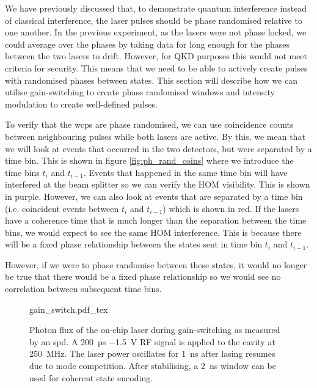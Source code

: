 \begin{parahigh}
We have previously discussed that, to demonstrate quantum interference instead of classical interference, the laser pulses should be phase randomised relative to one another. In the previous experiment, as the lasers were not phase locked, we could average over the phases by taking data for long enough for the phases between the two lasers to drift. However, for \ac{QKD} purposes this would not meet criteria for security. This means that we need to be able to actively create pulses with randomised phases between states. This section will describe how we can utilise gain-switching to create phase randomised windows and intensity modulation to create well-defined pulses. 

To verify that the \acp{wcp} are phase randomised, we can use coincidence counts between neighbouring pulses while both lasers are active. By this, we mean that we will look at events that occurred in the two detectors, but were separated by a time bin. This is shown in figure \ref{fig:ph_rand_coins} where we introduce the time bins $t_i$ and $t_{i-1}$. Events that happened in the same time bin will have interfered at the beam splitter so we can verify the \ac{HOM} visibility. This is shown in purple. However, we can also look at events that are separated by a time bin (i.e. coincident events between $t_i$ and $t_{i-1}$) which is shown in red. If the lasers have a coherence time that is much longer than the separation between the time bins, we would expect to see the same \ac{HOM} interference. This is because there will be a fixed phase relationship between the states sent in time bin $t_i$ and $t_{i-1}$.

However, if we were to phase randomise between these states, it would no longer be true that there would be a fixed phase relationship so we would see no correlation between subsequent time bins.

\end{parahigh}

\begin{figure}[t]
	\centering
	\def\svgwidth{0.8\textwidth} 
	{gain_switch.pdf_tex}
	\caption[Photon flux whilst gain-switching of the on-chip lasers at \SI{250}{MHz}]{Photon flux of the on-chip laser during gain-switching as measured by an \acs{spd}. A \SI{200}{ps} \SI{-1.5}{V} RF signal is applied to the cavity at \SI{250}{MHz}. The laser power oscillates for \SI{1}{ns} after lasing resumes due to mode competition. After stabilising, a \SI{2}{ns} window can be used for coherent state encoding.}	
	\label{fig:gain_switch}
\end{figure}

